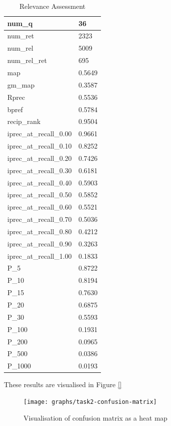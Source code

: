 \begin{table}[htb]
{\begin{tabular}{ | l | l | }
	num\_q & 36 \\ \hline
	num\_ret & 2323 \\ \hline
	num\_rel & 5009 \\ \hline
	num\_rel\_ret & 695 \\ \hline
	map & 0.5649 \\ \hline
	gm\_map & 0.3587 \\ \hline
	Rprec & 0.5536 \\ \hline
	bpref & 0.5784 \\ \hline
	recip\_rank & 0.9504 \\ \hline
	iprec\_at\_recall\_0.00 & 0.9661 \\ \hline
	iprec\_at\_recall\_0.10 & 0.8252 \\ \hline
	iprec\_at\_recall\_0.20 & 0.7426 \\ \hline
	iprec\_at\_recall\_0.30 & 0.6181 \\ \hline
	iprec\_at\_recall\_0.40 & 0.5903 \\ \hline
	iprec\_at\_recall\_0.50 & 0.5852 \\ \hline
	iprec\_at\_recall\_0.60 & 0.5521 \\ \hline
	iprec\_at\_recall\_0.70 & 0.5036 \\ \hline
	iprec\_at\_recall\_0.80 & 0.4212 \\ \hline
	iprec\_at\_recall\_0.90 & 0.3263 \\ \hline
	iprec\_at\_recall\_1.00 & 0.1833 \\ \hline
	P\_5 & 0.8722 \\ \hline
	P\_10 & 0.8194 \\ \hline
	P\_15 & 0.7630 \\ \hline
	P\_20 & 0.6875 \\ \hline
	P\_30 & 0.5593 \\ \hline
	P\_100 & 0.1931 \\ \hline
	P\_200 & 0.0965 \\ \hline
	P\_500 & 0.0386 \\ \hline
	P\_1000 & 0.0193 \\ \hline
    \end{tabular}
    \caption{Relevance Assessment}
    }
\end{table}

These results are visualised in Figure \ref{}

\begin{figure}[!hbt]
    \centering
    \texttt{[image: graphs/task2-confusion-matrix]}
    \caption{Visualisation of confusion matrix as a heat map}
    \label{fig:manual-result}
\end{figure}
